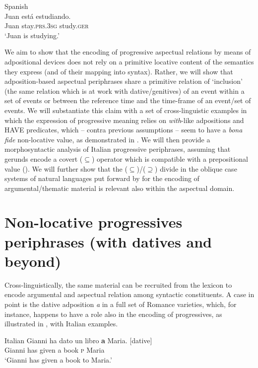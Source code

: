 \documentclass[output=paper,modfonts,nonflat,newtxmath,colorlinks,citecolor=brown]{langsci/langscibook}
\begin{document}
     \ex Spanish\\\label{ex:franco:9b}
    \gll  Juan está estudiando.\\
        Juan stay.\textsc{prs.3sg} study.\textsc{ger}\\
    \glt `Juan is studying.'
    \z
    \z

We aim to show that the encoding of progressive aspectual relations by means of adpositional devices does not rely on a primitive locative content of the semantics they express (and of their mapping into syntax). Rather, we will show that adposition-based aspectual periphrases share a primitive relation of ‘inclusion’ (the same relation which is at work with dative/genitives) of an event within a set of events or between the reference time and the time-frame of an event/set of events. We will substantiate this claim with a set of cross-linguistic examples in which the expression of progressive meaning relies on \textit{with}{}-like adpositions and HAVE predicates, which -- contra previous assumptions \citep{Freeze1992, DenDikken1998} -- seem to have a \textit{bona fide} non-locative value, as demonstrated in \citet{Levinson2011}. We will then provide a morphosyntactic analysis of Italian progressive periphrases, assuming that gerunds encode a covert (${\subseteq}$) operator which is compatible with a prepositional value (\citealt{Gallego2010, Franco2015}). We will further show that the (${\subseteq}$)/(${\supseteq}$) divide in the oblique case systems of natural languages put forward by \citet{FrancoManzini2017Ins} for the encoding of argumental/thematic material is relevant also within the aspectual domain.

\section{Non-locative progressives periphrases (with datives and beyond)}
\label{sec:franco:2}

Cross-linguistically, the same material can be recruited from the lexicon to encode argumental and aspectual relation among syntactic constituents. A case in point is the dative adposition \textit{a} in a full set of Romance varieties, which, for instance, happens to have a role also in the encoding of progressives, as illustrated in , with Italian examples.

\ea%
    Italian\label{ex:franco:10}
    \ea \label{ex:franco:10a}
    \gll Gianni ha dato un libro \textbf{a} Maria. \hfill{[dative]}\\
        Gianni has given a book \textsc{p} Maria\\
    \glt ‘Gianni has given a book to Maria.’
\end{document}
